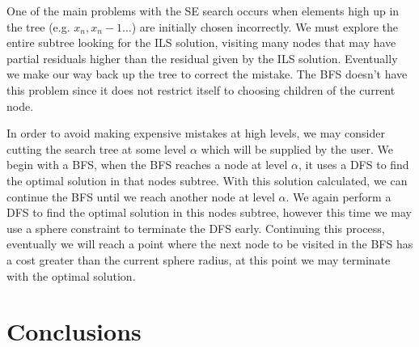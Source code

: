 \documentclass[12pt,Bold,letterpaper]{mcgilletdclass}
\begin{document}
One of the main problems with the SE search occurs when elements high up in the tree (e.g. $x_n, x_n-1 \dots$) are initially chosen incorrectly. We must explore the entire subtree looking for the ILS solution, visiting many nodes that may have partial residuals higher than the residual given by the ILS solution. Eventually we make our way back up the tree to correct the mistake. The BFS doesn't have this problem since it does not restrict itself to choosing children of the current node.

In order to avoid making expensive mistakes at high levels, we may consider cutting the search tree at some level $\alpha$ which will be supplied by the user. We begin with a BFS, when the BFS reaches a node at level $\alpha$, it uses a DFS to find the optimal solution in that nodes subtree. With this solution calculated, we can continue the BFS until we reach another node at level $\alpha$. We again perform a DFS to find the optimal solution in this nodes subtree, however this time we may use a sphere constraint to terminate the DFS early. Continuing this process, eventually we will reach a point where the next node to be visited in the BFS has a cost greater than the current sphere radius, at this point we may terminate with the optimal solution.


\chapter{Conclusions} \label{chap:Conclusion}






\end{document}

